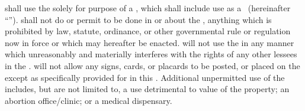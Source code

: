 \lessee shall use the \premises solely for purpose of a \permittedUsePrimary, which shall include use as a \permittedUseSecondary\ (hereinafter ``\permittedUse''). \lessee shall not do or permit to be done in or about the \premises, anything which is prohibited by law, statute, ordinance, or other governmental rule or regulation now in force or which may hereafter be enacted. \lessee will not use the \premises in any manner which unreasonably and materially interferes with the rights of any other lessees in the \building. \lessee will not allow any signs, cards, or placards to be posted, or placed on the \premises except as specifically provided for in this \lease. Additional unpermitted use of the \premises includes, but are not limited to, a use detrimental to value of the property; an abortion office/clinic; or a medical dispensary.
